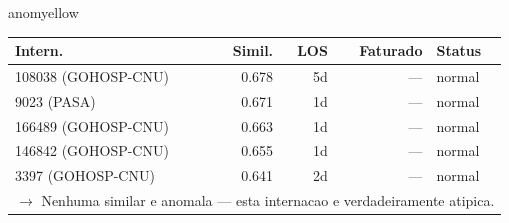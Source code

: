 \documentclass[a4paper,10pt]{article}
\begin{document}
\begin{anomalycard}[Internacao 119574 | PASA | MODERADO (z=2.10)]{anomyellow}
\begin{tabular}{l r r r l}\toprule\textbf{Intern.} & \textbf{Simil.} & \textbf{LOS} & \textbf{Faturado} & \textbf{Status} \\\midrule
108038 (GOHOSP-CNU) & 0.678 & 5d & --- & \textcolor{jcubeblue}{normal} \\
9023 (PASA) & 0.671 & 1d & --- & \textcolor{jcubeblue}{normal} \\
166489 (GOHOSP-CNU) & 0.663 & 1d & --- & \textcolor{jcubeblue}{normal} \\
146842 (GOHOSP-CNU) & 0.655 & 1d & --- & \textcolor{jcubeblue}{normal} \\
3397 (GOHOSP-CNU) & 0.641 & 2d & --- & \textcolor{jcubeblue}{normal} \\
\multicolumn{5}{l}{\textcolor{jcubeblue}{\small $\rightarrow$ Nenhuma similar e anomala --- esta internacao e verdadeiramente atipica.}} \\
\bottomrule\end{tabular}



\end{anomalycard}

\newpage
\end{document}
